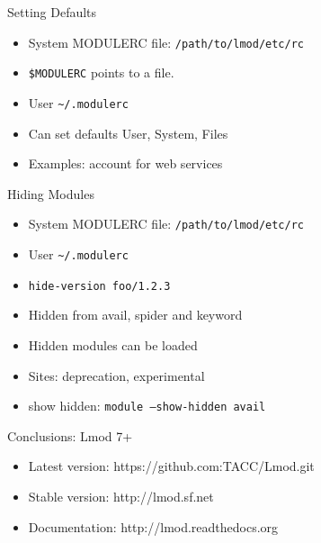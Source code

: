\documentclass{beamer}
\begin{document}
\begin{frame}{Setting Defaults}
  \begin{itemize}
    \item System MODULERC file: \texttt{/path/to/lmod/etc/rc}
    \item \texttt{\$MODULERC} points to a file.
    \item User \texttt{\textasciitilde/.modulerc}
    \item Can set defaults User, System, Files
    \item Examples: account for web services
  \end{itemize}
\end{frame}

\begin{frame}{Hiding Modules}
  \begin{itemize}
    \item System MODULERC file: \texttt{/path/to/lmod/etc/rc}
    \item User \texttt{\textasciitilde/.modulerc}
    \item \texttt{\color{blue}hide-version foo/1.2.3}
    \item Hidden from avail, spider and keyword
    \item Hidden modules can be loaded
    \item Sites: deprecation, experimental
    \item show hidden: \texttt{module --show-hidden avail}
  \end{itemize}
\end{frame}


\begin{frame}{Conclusions: Lmod 7+}
  \begin{itemize}
    \item Latest version: https://github.com:TACC/Lmod.git
    \item Stable version: http://lmod.sf.net
    \item Documentation:  http://lmod.readthedocs.org
  \end{itemize}
\end{frame}
\end{document}
